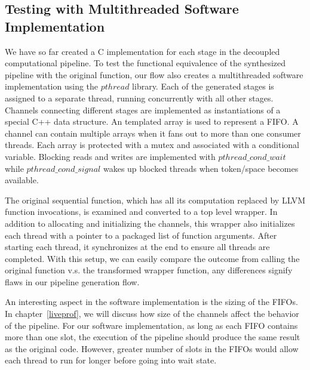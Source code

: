 \subsection{Testing with Multithreaded Software Implementation}
We have so far created a C implementation for each
stage in the decoupled computational pipeline. 
To test the functional equivalence of the synthesized pipeline with the original
function, our flow also creates a multithreaded software implementation using the
$pthread$ library. Each of
the generated stages is assigned to a separate thread, running concurrently with 
all other stages. Channels connecting different stages are implemented as instantiations of a special C++ data structure. An templated array is used to represent a FIFO. A channel can contain multiple arrays when it fans out to
more than one consumer threads. Each array is protected with a mutex and associated
with a conditional variable. Blocking reads and writes are implemented with $pthread\_cond\_wait$ while $pthread\_cond\_signal$ wakes up blocked threads when
token/space becomes available. 

The original sequential function, which has all its computation replaced by
LLVM function invocations, is examined and converted to a top level wrapper. 
In addition to allocating and initializing the channels, this wrapper also initializes
each thread with a pointer to a packaged list of function arguments. After starting
each thread, it synchronizes at the end to ensure all threads are completed. With this setup, we can easily compare the outcome from calling the original function v.s. the transformed wrapper function, any differences signify flaws in our pipeline generation flow.

An interesting aspect in the software implementation is the sizing of the FIFOs. In chapter~\ref{liveprof}, we will discuss how size of the channels affect the behavior
of the pipeline. For our software implementation, as long as each FIFO contains more than
one slot, the execution of the pipeline should produce the same result as the
original code. However, greater number of slots in the FIFOs would allow each thread to run for longer before going into wait state.

